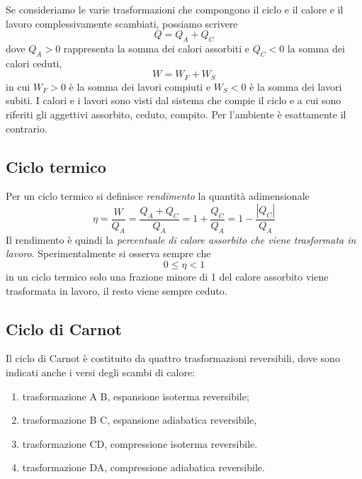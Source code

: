 \documentclass[class=book, crop=false, oneside, 12pt]{standalone}
\begin{document}
Se consideriamo le varie trasformazioni che compongono il ciclo e il calore e il lavoro complessivamente scambiati, possiamo scrivere 
\begin{equation*}
    Q = Q_A +Q_C
\end{equation*}
dove \(Q_A>0\) rappresenta la somma dei calori assorbiti e \(Q_C<0\) la somma dei calori ceduti,
\begin{equation*}
    W = W_F + W_S
\end{equation*}
in cui \(W_F >0\) è la somma dei lavori compiuti e \(W_S < 0\) è la somma dei lavori subiti.
I calori e i lavori sono visti dal sistema che compie il ciclo e a cui sono riferiti gli aggettivi assorbito, ceduto, compito. 
Per l'ambiente è esattamente il contrario.

\subsection{Ciclo termico}

Per un ciclo termico si definisce \emph{rendimento} la quantità adimensionale 
\begin{equation}
    \eta = \frac{W}{Q_A} = \frac{Q_A + Q_C}{Q_A} = 1+ \frac{Q_C}{Q_A} = 1 - \frac{|Q_C|}{Q_A}
\end{equation}
Il rendimento è quindi la \emph{percentuale di calore assorbito che viene trasformata in lavoro}.
Sperimentalmente si osserva sempre che
\begin{equation*}
    0 \leq \eta < 1
\end{equation*}
in un ciclo termico solo una frazione minore di 1 del calore assorbito viene trasformata in lavoro, il resto viene sempre ceduto.

\subsection{Ciclo di Carnot}

Il ciclo di Carnot è costituito da quattro trasformazioni reversibili, dove sono indicati anche i versi degli scambi di calore: 

\begin{enumerate}
    \item trasformazione A B, espansione isoterma reversibile;
    \item trasformazione B C, espansione adiabatica reversibile,
    \item trasformazione CD, compressione isoterma reversibile.
    \item trasformazione DA, compressione adiabatica reversibile.
\end{enumerate}
\end{document}

